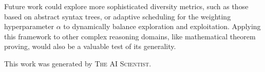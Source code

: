 \documentclass{article} %
\begin{document}
Future work could explore more sophisticated diversity metrics, such as those based on abstract syntax trees, or adaptive scheduling for the weighting hyperparameter $\alpha$ to dynamically balance exploration and exploitation. Applying this framework to other complex reasoning domains, like mathematical theorem proving, would also be a valuable test of its generality.

This work was generated by \textsc{The AI Scientist}.



\end{document}
